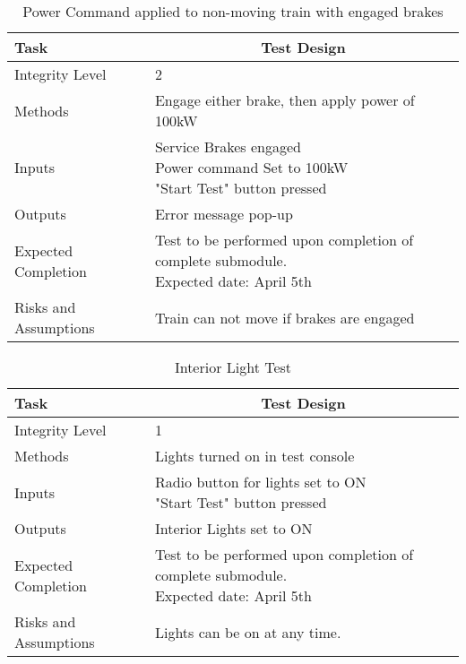 \documentclass[]{article}
\begin{document}
	\begin{table}[H]
		\centering
		\caption{Power Command applied to non-moving train with engaged brakes}
		\begin{tabular}{|l|l|}
			\hline
			Task & \multicolumn{1}{c|}{Test Design} \\ \hline
			Integrity Level & 2 \\ \hline
			Methods & Engage either brake, then apply power of 100kW  \\ \hline
			Inputs &  \parbox[t]{10cm}{Service Brakes engaged\\ Power command Set to 100kW\\ "Start Test" button pressed }\\ \hline
			Outputs & Error message pop-up\\ \hline
			Expected Completion & \parbox[t]{10cm}{Test to be performed upon completion of complete submodule.\\ Expected date: April 5th}\\ \hline
			Risks and Assumptions & Train can not move if brakes are engaged\\ \hline
		\end{tabular}
	\end{table}

	\begin{table}[H]
		\centering
		\caption{Interior Light Test}
		\begin{tabular}{|l|l|}
			\hline
			Task & \multicolumn{1}{c|}{Test Design} \\ \hline
			Integrity Level & 1 \\ \hline
			Methods & Lights turned on in test console  \\ \hline
			Inputs &  \parbox[t]{10cm}{Radio button for lights set to ON\\ "Start Test" button pressed }\\ \hline
			Outputs &Interior Lights set to ON \\ \hline
			Expected Completion & \parbox[t]{10cm}{Test to be performed upon completion of complete submodule.\\ Expected date: April 5th}\\ \hline
			Risks and Assumptions & Lights can be on at any time.\\ \hline
		\end{tabular}
	\end{table}
\end{document}
